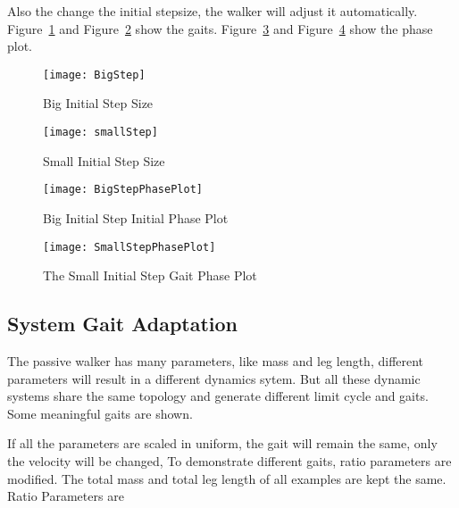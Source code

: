 Also the change the initial stepsize, the walker will adjust it automatically.
Figure~\ref{fig:bigStepIni} and Figure~\ref{fig:smallStepini} show the gaits.
Figure~\ref{fig:bigstepiniGaitPlot} and Figure~\ref{fig:smallstepiniPhasePlot} show the phase plot.

\begin{figure}[!htbp]
  \begin{center}
      \texttt{[image: BigStep]}
    \caption{Big Initial Step Size}
    \label{fig:bigStepIni}
\end{center}
\end{figure}


\begin{figure}[!htbp]
  \begin{center}
      \texttt{[image: smallStep]}
    \caption{Small Initial Step Size}
    \label{fig:smallStepini}
\end{center}
\end{figure}


\begin{figure}[!htbp]
  \begin{center}
      \texttt{[image: BigStepPhasePlot]}
    \caption{Big Initial Step Initial Phase Plot}
    \label{fig:bigstepiniGaitPlot}
\end{center}
\end{figure}


\begin{figure}[!htbp]
  \begin{center}
      \texttt{[image: SmallStepPhasePlot]}
    \caption{The Small Initial Step Gait Phase Plot}
    \label{fig:smallstepiniPhasePlot}
\end{center}
\end{figure}







\subsection{System Gait Adaptation}
The passive walker has many parameters, like mass and leg length, different parameters will result in a different dynamics sytem.
But all these dynamic systems  share the same topology and generate different limit cycle and gaits.
Some meaningful gaits are shown.

If all the parameters are scaled in uniform, the gait will remain the same, only the velocity will be changed,
To demonstrate different gaits, ratio parameters are modified. The total mass and total leg length of all examples are kept the same.
Ratio Parameters are 
\begin{itemize}
\end{itemize}


